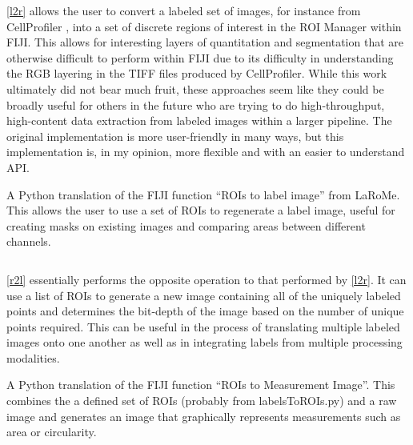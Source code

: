 \autoref{l2r} allows the user to convert a labeled set of images, for instance from CellProfiler \citep{Carpenter2006, Kamentsky2011, Stirling2021, McQuin2018}, into a set of discrete regions of interest in the ROI Manager within FIJI. This allows for interesting layers of quantitation and segmentation that are otherwise difficult to perform within FIJI due to its difficulty in understanding the RGB layering in the TIFF files produced by CellProfiler. While this work ultimately did not bear much fruit, these approaches seem like they could be broadly useful for others in the future who are trying to do high\hyp{}throughput, high\hyp{}content data extraction from labeled images within a larger pipeline. The original implementation is more user\hyp{}friendly in many ways, but this implementation is, in my opinion, more flexible and with an easier to understand API.

\begin{code}
\caption{A Python translation of the FIJI function ``ROIs to label image'' from LaRoMe. This allows the user to use a set of ROIs to regenerate a label image, useful for creating masks on existing images and comparing areas between different channels.}
\label{r2l}

\inputminted[breaklines,frame=single,fontsize=\small]{python}{source/ROIsTolabels.py}

\end{code}

\autoref{r2l} essentially performs the opposite operation to that performed by \autoref{l2r}. It can use a list of ROIs to generate a new image containing all of the uniquely labeled points and determines the bit\hyp{}depth of the image based on the number of unique points required. This can be useful in the process of translating multiple labeled images onto one another as well as in integrating labels from multiple processing modalities.

\begin{code}
\caption{A Python translation of the FIJI function ``ROIs to Measurement Image''. This combines the a defined set of ROIs (probably from labelsToROIs.py) and a raw image and generates an image that graphically represents measurements such as area or circularity.}
\label{r2m}

\inputminted[breaklines,frame=single,fontsize=\small]{python}{source/ROIsToMap.py}

\end{code}


